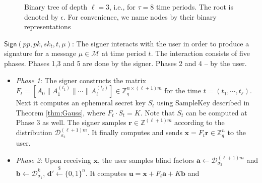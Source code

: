 \documentclass[runningheads]{llncs}
\def\ZZ{\mathbb{Z}}
\def\cal{\mathcal}
\def\bf{\mathbf}
\begin{document}
\begin{description}
\begin{figure}
	\caption{Binary tree of depth $\ell=3$, i.e., for $\tau=8$ time periods. The root is denoted by $\epsilon$. 
	For convenience, we name nodes by their binary representations}
	\label{fig2}
\end{figure}
\item \underline{$\textsf{Sign} (pp,pk, sk_t,t,\mu)$}:  
The signer interacts with the user in order 
to produce a signature for a message $\mu \in \cal{M}$ at time period $t$.
The interaction consists of five phases. Phases 1,3 and 5 are done by the signer.
Phases 2 and 4 -- by the user.
	\begin{itemize}
	\item \textit{Phase 1}: 
		The signer constructs the matrix $F_t=\left[A_0\| A_1^{(t_1)} \| \cdots \|A_\ell^{(t_\ell)}\right] \in \ZZ_q^{n \times (\ell+1) m}$
		for the time $t= (t_1, \cdots, t_\ell)$.
		Next it computes an ephemeral secret key $S_t$ using \textsf{SampleKey} described in 
		Theorem \ref{thm:Gauss}, where $F_t\cdot S_t=K$. 
		Note that $S_t$ can be computed at Phase 3 as well.
		The signer samples $\bf{r} \in \mathbb{Z} ^{(\ell+1)m}$    
		according to the distribution $\cal{D}^{(\ell+1)m}_{\sigma_2}$. It finally 
		computes and sends  $\mathbf{x}=F_t\mathbf{r} \in \ZZ_q^{n}$ to the user.
	\item \textit{Phase 2}: 
		Upon receiving $\textbf{x}$, the user samples blind factors 
		$\mathbf{a} \leftarrow \mathcal{D}_{\sigma_3}^{(\ell+1)m}$ and 
		$\mathbf{b} \leftarrow \mathcal{D}_{\sigma_1}^k$,  $\mathbf{d}' \xleftarrow{\$} \{0,1\}^n$. 
		It computes $\mathbf{u}=\mathbf{x}+F_t\mathbf{a} +K\mathbf{b}$ and 

\end{itemize}
\end{description}
\end{document}
